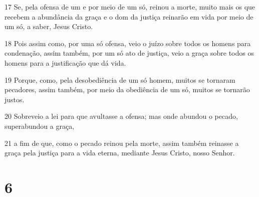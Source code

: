\par 17 Se, pela ofensa de um e por meio de um só, reinou a morte, muito mais os que recebem a abundância da graça e o dom da justiça reinarão em vida por meio de um só, a saber, Jesus Cristo.
\par 18 Pois assim como, por uma só ofensa, veio o juízo sobre todos os homens para condenação, assim também, por um só ato de justiça, veio a graça sobre todos os homens para a justificação que dá vida.
\par 19 Porque, como, pela desobediência de um só homem, muitos se tornaram pecadores, assim também, por meio da obediência de um só, muitos se tornarão justos.
\par 20 Sobreveio a lei para que avultasse a ofensa; mas onde abundou o pecado, superabundou a graça,
\par 21 a fim de que, como o pecado reinou pela morte, assim também reinasse a graça pela justiça para a vida eterna, mediante Jesus Cristo, nosso Senhor.

\chapter{6}

